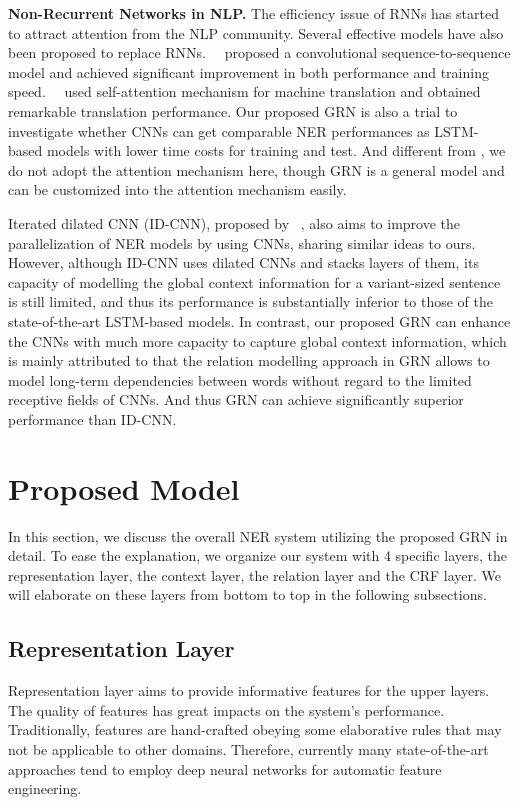 \documentclass[letterpaper]{article} \usepackage{aaai19}  \usepackage{times}  \usepackage{helvet}  \usepackage{courier}  \usepackage{url}  \usepackage{graphicx}  \usepackage{amsmath}
\newcommand{\ie}{\text{i.e.,}}
\newcommand{\GRN}{GRN}
\begin{document}
\textbf{Non-Recurrent Networks in NLP.} The efficiency issue of RNNs has started to attract attention from the NLP community. Several effective models have also been proposed to replace RNNs.~\citeauthor{gehring2017convolutional}~ proposed a convolutional sequence-to-sequence model and achieved significant improvement in both performance and training speed.~\citeauthor{vaswani2017attention}~ used self-attention mechanism for machine translation and obtained remarkable translation performance. Our proposed \GRN{} is also a trial to investigate whether CNNs can get comparable NER performances as LSTM-based models with lower time costs for training and test. And different from \cite{gehring2017convolutional,vaswani2017attention}, we do not adopt the attention mechanism here, though \GRN{} is a general model and can be customized into the attention mechanism easily. 

Iterated dilated CNN (ID-CNN), proposed by \citeauthor{strubell2017fast}~, also aims to improve the parallelization of NER models by using CNNs, sharing similar ideas to ours. However, although ID-CNN uses dilated CNNs and stacks layers of them, its capacity of modelling the global context information for a variant-sized sentence is still limited, and thus its performance is substantially inferior to those of the state-of-the-art LSTM-based models. In contrast, our proposed \GRN{} can enhance the CNNs with much more capacity to capture global context information, which is mainly attributed to that the relation modelling approach in \GRN{} allows to model long-term dependencies between words without regard to the limited receptive fields of CNNs. And thus \GRN{} can achieve significantly superior performance than ID-CNN.

\section{Proposed Model}
In this section, we discuss the overall NER system utilizing the proposed \GRN{} in detail. To ease the explanation, we organize our system with 4 specific layers, \ie{} the representation layer, the context layer, the relation layer and the CRF layer. We will elaborate on these layers from bottom to top in the following subsections.



\subsection{Representation Layer}
Representation layer aims to provide informative features for the upper layers. The quality of features has great impacts on the system's performance. Traditionally, features are hand-crafted obeying some elaborative rules that may not be applicable to other domains. Therefore, currently many state-of-the-art approaches tend to employ deep neural networks for automatic feature engineering.
\end{document}
